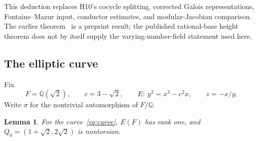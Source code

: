 \documentclass[11pt]{article}
\newtheorem{lemma}[theorem]{Lemma}
\theoremstyle{definition}\newtheorem{inputthm}[theorem]{Hypothesis}
\theoremstyle{remark}\newtheorem{remark}[theorem]{Remark}
\newcommand{\Q}{\mathbb Q}\newcommand{\Z}{\mathbb Z}
\begin{document}
This deduction replaces H10's cocycle splitting, corrected Galois
representations, Fontaine--Mazur input, conductor estimates, and
modular-Jacobian comparison. The earlier theorem~\cite{vKK} is a
preprint result; the published rational-base height theorem does not
by itself supply the varying-number-field statement used here.

\subsection{The elliptic curve}

Fix
\begin{equation}\label{eq:curve}
 F=\Q(\sqrt2),\qquad c=3-\sqrt2,\qquad
 E:\ y^2=x^3-c^2x,\qquad z=-x/y.
\end{equation}
Write $\sigma$ for the nontrivial automorphism of $F/\Q$.
\begin{lemma}\label{lem:rank-one}
For the curve~\eqref{eq:curve}, $E(F)$ has rank one, and
$Q_0=(1+\sqrt2,2\sqrt2)$ is nontorsion.
\end{lemma}
\end{document}
